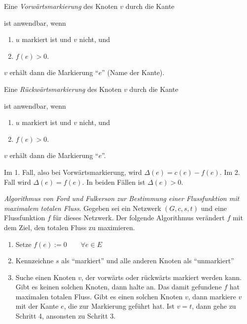 \begin{beispiel}
\end{beispiel}


\begin{definition}

    Eine \emph{Vorwärtsmarkierung} des Knoten $v$ durch die Kante 
    ist anwendbar, wenn \begin{enumerate}
        \item $u$ markiert ist und $v$ nicht, und
        \item $f(e) > 0$.
    \end{enumerate}
    $v$ erhält dann die Markierung ``$e$'' (Name der Kante). 
    
    Eine \emph{Rückwärtsmarkierung} des Knoten $v$ durch die Kante 
    ist anwendbar, wenn \begin{enumerate}
        \item $u$ markiert ist und $v$ nicht, und
        \item $f(e) > 0$.
    \end{enumerate}
    $v$ erhält dann die Markierung ``$e$''. 

    Im 1. Fall, also bei Vorwärtsmarkierung, wird $\Delta(e) = c(e) - f(e)$. Im 2. Fall wird $\Delta(e) = f(e)$. In beiden Fällen ist $\Delta(e) > 0$.
\end{definition}


\begin{definition}

    \emph{Algorithmus von Ford und Fulkerson zur Bestimmung einer Flussfunktion mit maximalem totalen Fluss}. Gegeben sei ein Netzwerk $(G, c, s, t)$ und eine Flussfunktion $f$ für dieses Netzwerk. Der folgende Algorithmus verändert $f$ mit dem Ziel, den totalen Fluss zu maximieren.

    \begin{enumerate}
        \item Setze $f(e) := 0 \qquad \forall e \in E$
        \item Kennzeichne $s$ als ``markiert'' und alle anderen Knoten als ``unmarkiert''
        \item Suche einen Knoten $v$, der vorwärts oder rückwärts markiert werden kann. Gibt es keinen solchen Knoten, dann halte an. Das damit gefundene $f$ hat maximalen totalen Fluss. Gibt es einen solchen Knoten $v$, dann markiere $v$ mit der Kante $e$, die zur Markierung geführt hat. Ist $v = t$, dann gehe zu Schritt 4, ansonsten zu Schritt 3.
    \end{enumerate}
\end{definition}
